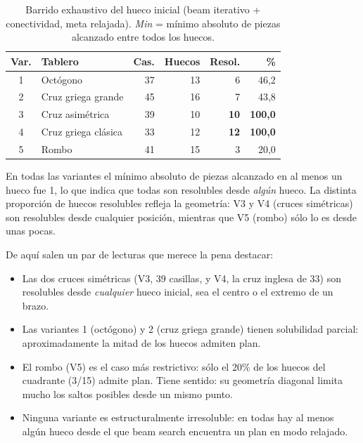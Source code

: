 \documentclass[conference,a4paper]{IEEEtran}
\begin{document}
\begin{table}[!htbp]
\caption{Barrido exhaustivo del hueco inicial (beam iterativo + conectividad, meta relajada). \emph{Min} = mínimo absoluto de piezas alcanzado entre todos los huecos.}
\label{tab:huecos}
\centering
\begin{tabular}{clrrrr}
\toprule
\textbf{Var.} & \textbf{Tablero} & \textbf{Cas.} & \textbf{Huecos} & \textbf{Resol.} & \textbf{\%} \\
\midrule
1 & Octógono                  & 37 & 13 &  6          &  46,2 \\
2 & Cruz griega grande        & 45 & 16 &  7          &  43,8 \\
3 & Cruz asimétrica           & 39 & 10 & \textbf{10} & \textbf{100,0} \\
4 & Cruz griega clásica       & 33 & 12 & \textbf{12} & \textbf{100,0} \\
5 & Rombo                     & 41 & 15 &  3          &  20,0 \\
\bottomrule
\end{tabular}
\par\smallskip
\footnotesize En todas las variantes el mínimo absoluto de piezas alcanzado
en al menos un hueco fue 1, lo que indica que todas son resolubles desde
\emph{algún} hueco. La distinta proporción de huecos resolubles refleja
la geometría: V3 y V4 (cruces simétricas) son resolubles desde cualquier
posición, mientras que V5 (rombo) sólo lo es desde unas pocas.
\end{table}

De aquí salen un par de lecturas que merece la pena destacar:
\begin{itemize}
\item Las dos cruces simétricas (V3, 39 casillas, y V4, la cruz inglesa
  de 33) son resolubles desde \emph{cualquier} hueco inicial, sea el
  centro o el extremo de un brazo.
\item Las variantes 1 (octógono) y 2 (cruz griega grande) tienen
  solubilidad parcial: aproximadamente la mitad de los huecos admiten
  plan.
\item El rombo (V5) es el caso más restrictivo: sólo el 20\% de los
  huecos del cuadrante (3/15) admite plan. Tiene sentido: su geometría
  diagonal limita mucho los saltos posibles desde un mismo punto.
\item Ninguna variante es estructuralmente irresoluble: en todas hay al
  menos algún hueco desde el que beam search encuentra un plan en modo
  relajado.
\end{itemize}
\end{document}
